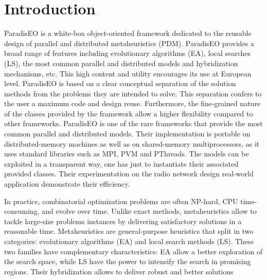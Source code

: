 \hypertarget{main_intro}{}\section{Introduction}\label{main_intro}
Paradis\-EO is a white-box object-oriented framework dedicated to the reusable design of parallel and distributed metaheuristics (PDM). Paradis\-EO provides a broad range of features including evolutionary algorithms (EA), local searches (LS), the most common parallel and distributed models and hybridization mechanisms, etc. This high content and utility encourages its use at European level. Paradis\-EO is based on a clear conceptual separation of the solution methods from the problems they are intended to solve. This separation confers to the user a maximum code and design reuse. Furthermore, the fine-grained nature of the classes provided by the framework allow a higher flexibility compared to other frameworks. Paradis\-EO is one of the rare frameworks that provide the most common parallel and distributed models. Their implementation is portable on distributed-memory machines as well as on shared-memory multiprocessors, as it uses standard libraries such as MPI, PVM and PThreads. The models can be exploited in a transparent way, one has just to instantiate their associated provided classes. Their experimentation on the radio network design real-world application demonstrate their efficiency.

In practice, combinatorial optimization problems are often NP-hard, CPU time-consuming, and evolve over time. Unlike exact methods, metaheuristics allow to tackle large-size problems instances by delivering satisfactory solutions in a reasonable time. Metaheuristics are general-purpose heuristics that split in two categories: evolutionary algorithms (EA) and local search methods (LS). These two families have complementary characteristics: EA allow a better exploration of the search space, while LS have the power to intensify the search in promising regions. Their hybridization allows to deliver robust and better solutions

